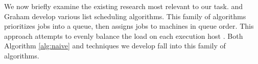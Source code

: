 \documentclass[11pt,letterpaper]{article}
\begin{document}

We now briefly examine the existing research most relevant to our task.  and Graham  develop various list scheduling algorithms. This family of algorithms prioritizes jobs into a queue, then assigns jobs to machines in queue order. This approach attempts to evenly balance the load on each execution host \cite{DeMorton80,ChengSin90}. 
Both Algorithm \ref{alg:naive} and techniques we develop fall into this family of algorithms.
\end{document}
